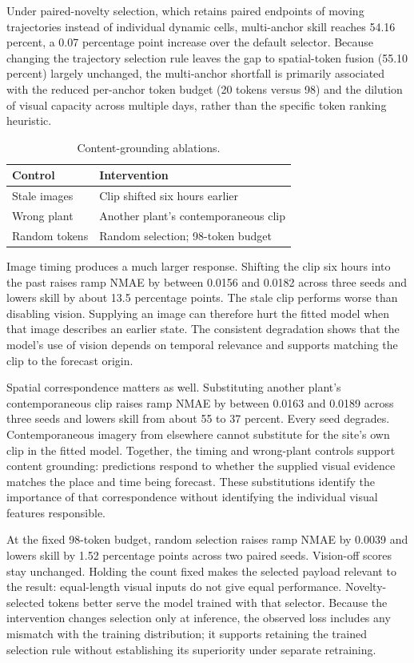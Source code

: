 Under paired-novelty selection, which retains paired endpoints of moving trajectories instead of individual dynamic cells, multi-anchor skill reaches 54.16 percent, a 0.07 percentage point increase over the default selector. Because changing the trajectory selection rule leaves the gap to spatial-token fusion (55.10 percent) largely unchanged, the multi-anchor shortfall is primarily associated with the reduced per-anchor token budget (20 tokens versus 98) and the dilution of visual capacity across multiple days, rather than the specific token ranking heuristic.

\begin{table}[htbp]
\centering
\begin{tabular}{@{}ll@{}}
\hline
Control & Intervention \\
\hline
Stale images & Clip shifted six hours earlier \\
Wrong plant & Another plant's contemporaneous clip \\
Random tokens & Random selection; 98-token budget \\
\hline
\end{tabular}
\caption{Content-grounding ablations.}
\label{tab:ablation-content-grounding}
\end{table}

Image timing produces a much larger response. Shifting the clip six hours into the past raises ramp NMAE by between 0.0156 and 0.0182 across three seeds and lowers skill by about 13.5 percentage points. The stale clip performs worse than disabling vision. Supplying an image can therefore hurt the fitted model when that image describes an earlier state. The consistent degradation shows that the model's use of vision depends on temporal relevance and supports matching the clip to the forecast origin.

Spatial correspondence matters as well. Substituting another plant's contemporaneous clip raises ramp NMAE by between 0.0163 and 0.0189 across three seeds and lowers skill from about 55 to 37 percent. Every seed degrades. Contemporaneous imagery from elsewhere cannot substitute for the site's own clip in the fitted model. Together, the timing and wrong-plant controls support content grounding: predictions respond to whether the supplied visual evidence matches the place and time being forecast. These substitutions identify the importance of that correspondence without identifying the individual visual features responsible.

At the fixed 98-token budget, random selection raises ramp NMAE by 0.0039 and lowers skill by 1.52 percentage points across two paired seeds. Vision-off scores stay unchanged. Holding the count fixed makes the selected payload relevant to the result: equal-length visual inputs do not give equal performance. Novelty-selected tokens better serve the model trained with that selector. Because the intervention changes selection only at inference, the observed loss includes any mismatch with the training distribution; it supports retaining the trained selection rule without establishing its superiority under separate retraining.


